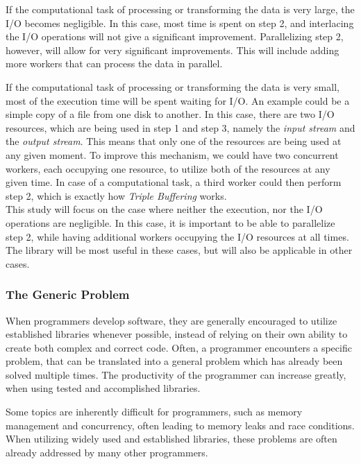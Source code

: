 \documentclass[a4paper]{article}
\begin{document}
If the computational task of processing or transforming the data is very large, the I/O becomes negligible. In this case, most time is spent on step 2, and interlacing the I/O operations will not give a significant improvement. Parallelizing step 2, however, will allow for very significant improvements. This will include adding more workers that can process the data in parallel.

If the computational task of processing or transforming the data is very small, most of the execution time will be spent waiting for I/O. An example could be a simple copy of a file from one disk to another. In this case, there are two I/O resources, which are being used in step 1 and step 3, namely the \textit{input stream} and the \textit{output stream}. This means that only one of the resources are being used at any given moment. To improve this mechanism, we could have two concurrent workers, each occupying one resource, to utilize both of the resources at any given time. In case of a computational task, a third worker could then perform step 2, which is exactly how \textit{Triple Buffering} works.\\

This study will focus on the case where neither the execution, nor the I/O operations are negligible. In this case, it is important to be able to parallelize step 2, while having additional workers occupying the I/O resources at all times. The library will be most useful in these cases, but will also be applicable in other cases.


\subsubsection{The Generic Problem}
When programmers develop software, they are generally encouraged to utilize established libraries whenever possible, instead of relying on their own ability to create both complex and correct code. Often, a programmer encounters a specific problem, that can be translated into a general problem which has already been solved multiple times. The productivity of the programmer can increase greatly, when using tested and accomplished libraries. 

Some topics are inherently difficult for programmers, such as memory management and concurrency, often leading to memory leaks and race conditions. When utilizing widely used and established libraries, these problems are often already addressed by many other programmers.\\
\end{document}
